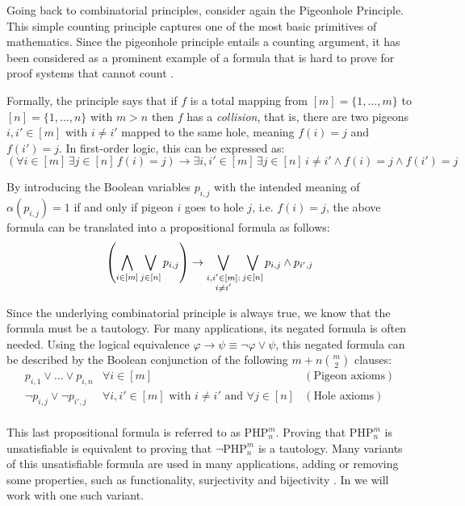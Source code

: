 Going back to combinatorial principles, consider again the Pigeonhole Principle. This simple counting principle captures one of the most basic primitives of mathematics. Since the pigeonhole principle entails a counting argument, it has been considered as a prominent example of a formula that is hard to prove for proof systems that cannot count \cite{php_lower, php_lower_2,php_easy,kraj_book,galesi_toran}.

Formally, the principle says that if $f$ is a total mapping from $[m] = \{1, \ldots, m\}$ to $[n] = \{1, \ldots, n\}$ with $m > n$ then $f$ has a \textit{collision}, that is, there are two pigeons $i,i' \in [m]$ with $i \neq i'$ mapped to the same hole, meaning $f(i) = j$ and $f(i') = j$. In first-order logic, this can be expressed as:
\begin{equation}
  (\forall i \in [m] \, \exists j \in [n] \, f(i) = j) \to \exists i,i' \in [m] \, \exists j \in [n] \, i \neq i' \land f(i) = j \land f(i') = j
\end{equation}

By introducing the Boolean variables $p_{i,j}$ with the intended meaning of $\alpha(p_{i,j}) = 1$ if and only if pigeon $i$ goes to hole $j$, i.e. $f(i) = j$, the above formula can be translated into a propositional formula as follows:
\begin{equation}
  \left ( \bigwedge_{i \in [m]} \bigvee_{j \in [n]} p_{i,j} \right ) \to \bigvee_{\substack{i,i' \in [m] :\\ i \neq i'}} \bigvee_{j \in [n]} p_{i,j} \land p_{i',j}
\end{equation}

Since the underlying combinatorial principle is always true, we know that the formula must be a tautology. For many applications, its negated formula is often needed. Using the logical equivalence $\varphi \to \psi  \equiv \lnot \varphi \lor \psi$, this negated formula can be described by the Boolean conjunction of the following $m + n\binom{m}{2}$ clauses:
\[\begin{array}{clr}
  p_{i,1} \lor \ldots \lor p_{i,n} & \forall i \in [m] & (\text{Pigeon axioms})\\
  \lnot p_{i,j} \lor \lnot p_{i', j} & \forall i,i' \in [m] \text{ with $i \neq i'$ and } \forall j \in [n] & (\text{Hole axioms})\\
\end{array}\]

This last propositional formula is referred to as $\mathrm{PHP}^{m}_n$. Proving that $\mathrm{PHP}^{m}_n$ is unsatisfiable is equivalent to proving that $\lnot \mathrm{PHP}^{m}_n$ is a tautology. Many variants of this unsatisfiable formula are used in many applications, adding or removing some properties, such as functionality, surjectivity and bijectivity \cite{php_variants}. In  we will work with one such variant.



